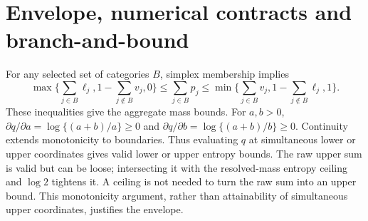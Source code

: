 \section{Envelope, numerical contracts and branch-and-bound}
For any selected set of categories $B$, simplex membership implies
\begin{equation}
 \max\{\sum_{j\in B}\ell_j,1-\sum_{j\notin B}v_j,0\}
 \le\sum_{j\in B}p_j\le
 \min\{\sum_{j\in B}v_j,1-\sum_{j\notin B}\ell_j,1\}.
\end{equation}
These inequalities give the aggregate mass bounds. For $a,b>0$, $\partial q/\partial a=\log\{(a+b)/a\}\ge0$ and $\partial q/\partial b=\log\{(a+b)/b\}\ge0$. Continuity extends monotonicity to boundaries. Thus evaluating $q$ at simultaneous lower or upper coordinates gives valid lower or upper entropy bounds. The raw upper sum is valid but can be loose; intersecting it with the resolved-mass entropy ceiling and $\log2$ tightens it. A ceiling is not needed to turn the raw sum into an upper bound. This monotonicity argument, rather than attainability of simultaneous upper coordinates, justifies the envelope.

